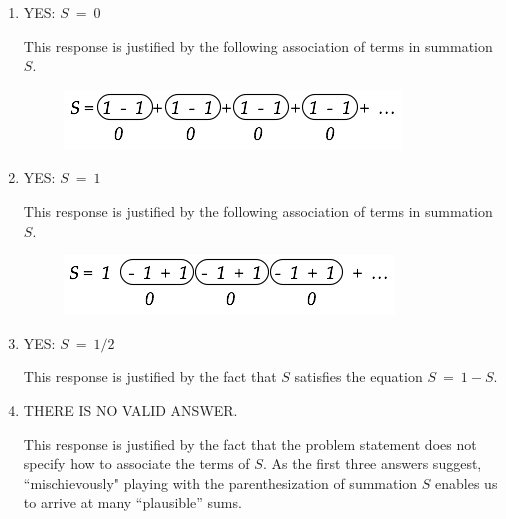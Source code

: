 \begin{enumerate}
\item
YES: $S \ = \ 0$

\smallskip

This response is justified by the following association of terms in summation $S$.
\begin{figure}[h]
\begin{center}
        \includegraphics[scale=0.45]{FiguresArithmetic/InfiniteParadox1}
\end{center}
\end{figure}

\medskip\item
YES: $S \ = \ 1$

\smallskip

This response is justified by the following association of terms in summation $S$.
\begin{figure}[h]
\begin{center}
        \includegraphics[scale=0.45]{FiguresArithmetic/InfiniteParadox2}
\end{center}
\end{figure}

\medskip\item
YES: $S \ = \ 1/2$
\smallskip

This response is justified by the fact that $S$ satisfies the equation $S \ = \ 1-S$.

\medskip\item
THERE IS NO VALID ANSWER.

\smallskip

This response is justified by the fact that the problem statement does not specify how to associate the terms of $S$.  As the first three answers suggest, ``mischievously" playing with the parenthesization of summation $S$ enables us to arrive at many ``plausible'' sums.
\end{enumerate}

\medskip

